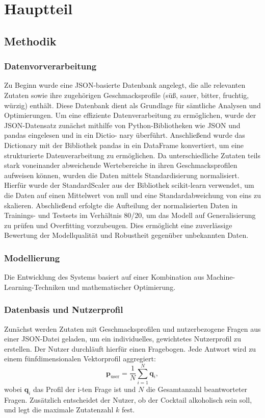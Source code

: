 \documentclass[12pt, a4paper]{report}
\begin{document}
\chapter{Hauptteil}
\section{Methodik}

\subsection{Datenvorverarbeitung}
Zu Beginn wurde eine JSON-basierte Datenbank angelegt, die alle relevanten Zutaten
sowie ihre zugehörigen Geschmacksprofile (süß, sauer, bitter, fruchtig, würzig) enthält.
Diese Datenbank dient als Grundlage für sämtliche Analysen und Optimierungen. Um
eine effiziente Datenverarbeitung zu ermöglichen, wurde der JSON-Datensatz zunächst
mithilfe von Python-Bibliotheken wie JSON und pandas eingelesen und in ein Dictio-
nary überführt. Anschließend wurde das Dictionary mit der Bibliothek pandas in ein
DataFrame konvertiert, um eine strukturierte Datenverarbeitung zu ermöglichen.
Da unterschiedliche Zutaten teils stark voneinander abweichende Wertebereiche in
ihren Geschmacksprofilen aufweisen können, wurden die Daten mittels Standardisierung normalisiert. Hierfür wurde der StandardScaler aus der Bibliothek scikit-learn
verwendet, um die Daten auf einen Mittelwert von null und eine Standardabweichung
von eins zu skalieren. Abschließend erfolgte die Aufteilung der normalisierten Daten
in Trainings- und Testsets im Verhältnis 80/20, um das Modell auf Generalisierung zu
prüfen und Overfitting vorzubeugen. Dies ermöglicht eine zuverlässige Bewertung der
Modellqualität und Robustheit gegenüber unbekannten Daten.

\subsection{Modellierung}
Die Entwicklung des Systems basiert auf einer Kombination aus Machine-Learning-Techniken und mathematischer Optimierung.

\subsection*{Datenbasis und Nutzerprofil}
Zunächst werden Zutaten mit Geschmacksprofilen und nutzerbezogene Fragen aus einer JSON-Datei geladen, um ein individuelles, gewichtetes Nutzerprofil zu erstellen. Der Nutzer durchläuft hierfür einen Fragebogen. Jede Antwort wird zu einem fünfdimensionalen Vektorprofil aggregiert:
\[
\mathbf{p}_{\text{user}} = \frac{1}{N} \sum_{i=1}^{N} \mathbf{q}_i,
\]
wobei \(\mathbf{q}_i\) das Profil der i-ten Frage ist und \(N\) die Gesamtanzahl beantworteter Fragen. Zusätzlich entscheidet der Nutzer, ob der Cocktail alkoholisch sein soll, und legt die maximale Zutatenzahl \(k\) fest.
\end{document}
